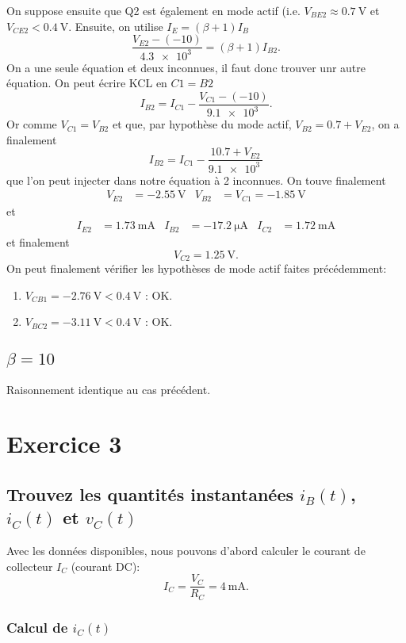 \documentclass[frenchb,DIV=13]{scrartcl}
\begin{document}
On suppose ensuite que Q2 est également en mode actif (i.e. $V_{BE2} \approx \SI{0.7}{\volt}$
et $V_{CE2} < \SI{0.4}{\volt}$. Ensuite, on utilise $I_E = (\beta+1)I_B$
\[ \frac{V_{E2}-(-10)}{\SI{4.3e3}{}} = (\beta+1)I_{B2}. \]
On a une seule équation et deux inconnues, il faut donc trouver unr autre équation. On
peut écrire KCL en $C1 = B2$
\[ I_{B2} = I_{C1} - \frac{V_{C1}-(-10)}{\SI{9.1e3}{}}. \]
Or comme $V_{C1} = V_{B2}$ et que, par hypothèse du mode actif, $V_{B2} = 0.7 + V_{E2}$,
on a finalement
\[ I_{B2} = I_{C1} - \frac{10.7 + V_{E2}}{\SI{9.1e3}{}}\]
que l'on peut injecter dans notre équation à 2 inconnues.
On touve finalement
\begin{align*}
	V_{E2} &= -\SI{2.55}{\volt} & V_{B2} &= V_{C1} = -\SI{1.85}{\volt}
\end{align*}
et
\begin{align*}
	I_{E2} &= \SI{1.73}{\milli\ampere} & I_{B2} &= -\SI{17.2}{\micro\ampere} & I_{C2} &=
	\SI{1.72}{\milli\ampere}
\end{align*}
et finalement
\[ V_{C2} = \SI{1.25}{\volt}. \]
On peut finalement vérifier les hypothèses de mode actif faites précédemment:
\begin{enumerate}
	\item $V_{CB1} = -\SI{2.76}{\volt} < \SI{0.4}{\volt}$ : OK.
	\item $V_{BC2} = -\SI{3.11}{\volt} < \SI{0.4}{\volt}$ : OK.
\end{enumerate}
 
\subsection*{$\beta = 10$}
Raisonnement identique au cas précédent.

\section*{Exercice 3}

\subsection*{Trouvez les quantités instantanées $i_B(t)$, $i_C(t)$ et $v_C(t)$}
Avec les données disponibles, nous pouvons d'abord calculer le courant de collecteur $I_C$
(courant DC):
\begin{equation}
	I_C = \dfrac{V_C}{R_C} = \SI{4}{\milli\ampere}.
\end{equation}

\subsubsection*{Calcul de $i_C(t)$}
\end{document}
